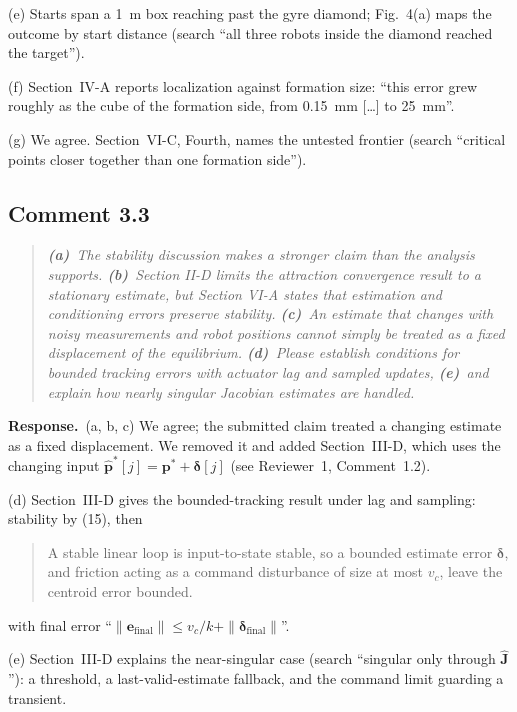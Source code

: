 \documentclass[10pt]{article}
\newcommand{\rev}[1]{#1}                             %
\newcommand{\resp}{\par\textbf{Response.}~}
\newenvironment{newtext}{\begin{quote}\small\sloppy}{\end{quote}}
\begin{document}
(e) Starts span a 1~m box reaching past the gyre diamond; Fig.~4(a) maps the outcome by start distance (search ``all three robots inside the diamond reached the target'').

(f) Section~IV-A reports localization against formation size: ``this error grew roughly as the cube of the formation side, from \rev{0.15}~mm [\ldots] to \rev{25}~mm''.

(g) We agree. Section~VI-C, Fourth, names the untested frontier (search ``critical points closer together than one formation side'').

\subsection*{Comment 3.3}

\begin{quote}\itshape
\textbf{(a)}~The stability discussion makes a stronger claim than the analysis supports.
\textbf{(b)}~Section II-D limits the attraction convergence result to a stationary estimate, but Section VI-A states that estimation and conditioning errors preserve stability.
\textbf{(c)}~An estimate that changes with noisy measurements and robot positions cannot simply be treated as a fixed displacement of the equilibrium.
\textbf{(d)}~Please establish conditions for bounded tracking errors with actuator lag and sampled updates,
\textbf{(e)}~and explain how nearly singular Jacobian estimates are handled.
\end{quote}

\resp (a, b, c) We agree; the submitted claim treated a changing estimate as a fixed displacement. We removed it and added Section~III-D, which uses the changing input $\hat{\mathbf{p}}^*[j] = \mathbf{p}^* + \boldsymbol\delta[j]$ (see Reviewer~1, Comment~1.2).

(d) Section~III-D gives the bounded-tracking result under lag and sampling: stability by (15), then
\begin{newtext}
A stable linear loop is input-to-state stable, so a bounded estimate error $\boldsymbol{\delta}$, and friction acting as a command disturbance of size at most $v_c$, leave the centroid error bounded.
\end{newtext}
with final error ``$\|\mathbf{e}_{\text{final}}\| \le v_c/k + \|\boldsymbol{\delta}_{\text{final}}\|$''.

(e) Section~III-D explains the near-singular case (search ``singular only through $\hat{\mathbf{J}}$''): a threshold, a last-valid-estimate fallback, and the command limit guarding a transient.
\end{document}
